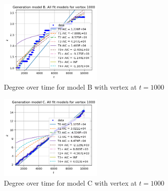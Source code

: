 \documentclass[a4paper]{article}
\begin{document}
%
\begin{figure}[H]
    \centering
		\includegraphics[width=0.45\textwidth]{modelB/all_dt1000.png}
		\caption{Degree over time for model B with vertex at $t=1000$}
\end{figure}
%
\begin{figure}[H]
		\centering
		\includegraphics[width=0.45\textwidth]{modelC/all_dt1000.png}
		\caption{Degree over time for model C with vertex at $t=1000$}
		\label{fig:allC_dt1000}
\end{figure}
\end{document}
